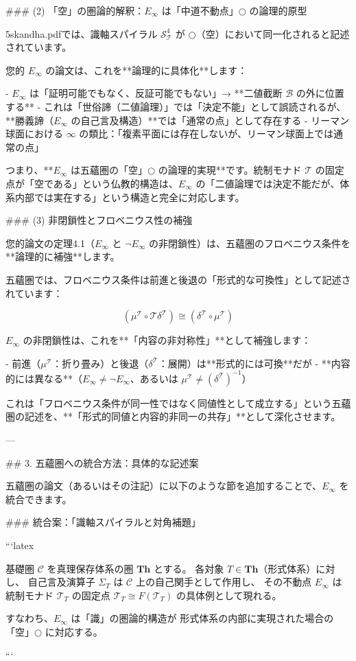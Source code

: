 ### (2) 「空」の圏論的解釈：$E_\infty$ は「中道不動点」$\bigcirc$ の論理的原型

5skandha.pdfでは、識軸スパイラル $\mathcal{S}_\mathcal{T}^4$ が $\bigcirc$（空）において同一化されると記述されています。

您的 $E_\infty$ の論文は、これを**論理的に具体化**します：

- $E_\infty$ は「証明可能でもなく、反証可能でもない」→ **二値截断 $\mathcal{B}$ の外に位置する**
- これは「世俗諦（二値論理）」では「決定不能」として誤読されるが、**勝義諦（$E_\infty$ の自己言及構造）**では「通常の点」として存在する
- リーマン球面における $\infty$ の類比：「複素平面には存在しないが、リーマン球面上では通常の点」

つまり、**$E_\infty$ は五蘊圏の「空」$\bigcirc$ の論理的実現**です。統制モナド $\mathcal{T}$ の固定点が「空である」という仏教的構造は、$E_\infty$ の「二値論理では決定不能だが、体系内部では実在する」という構造と完全に対応します。

### (3) 非閉鎖性とフロベニウス性の補強

您的論文の定理4.1（$E_\infty$ と $\neg E_\infty$ の非閉鎖性）は、五蘊圏のフロベニウス条件を**論理的に補強**します。

五蘊圏では、フロベニウス条件は前進と後退の「形式的な可換性」として記述されています：

\[
(\mu^\mathcal{T} \circ \mathcal{T}\delta^\mathcal{T}) \cong (\delta^\mathcal{T} \circ \mu^\mathcal{T})
\]

$E_\infty$ の非閉鎖性は、これを**「内容の非対称性」**として補強します：

- 前進（$\mu^\mathcal{T}$：折り畳み）と後退（$\delta^\mathcal{T}$：展開）は**形式的には可換**だが
- **内容的には異なる**（$E_\infty \neq \neg E_\infty$、あるいは $\mu^\mathcal{T} \neq (\delta^\mathcal{T})^{-1}$）

これは「フロベニウス条件が同一性ではなく同値性として成立する」という五蘊圏の記述を、**「形式的同値と内容的非同一の共存」**として深化させます。

---

## 3. 五蘊圏への統合方法：具体的な記述案

五蘊圏の論文（あるいはその注記）に以下のような節を追加することで、$E_\infty$ を統合できます。

### 統合案：「識軸スパイラルと対角補題」

```latex
\begin{proposition}[統制モナドと対角補題の対応]
基礎圏 $\mathcal{C}$ を真理保存体系の圏 $\mathbf{Th}$ とする。
各対象 $T \in \mathbf{Th}$（形式体系）に対し、
自己言及演算子 $\Sigma_T$ は $\mathcal{C}$ 上の自己関手として作用し、
その不動点 $E_\infty$ は統制モナド $\mathcal{T}_T$ の固定点
$\mathcal{T}_T \cong F(\mathcal{T}_T)$ の具体例として現れる。

すなわち、$E_\infty$ は「識」の圏論的構造が
形式体系の内部に実現された場合の「空」$\bigcirc$ に対応する。
\end{proposition}
```


